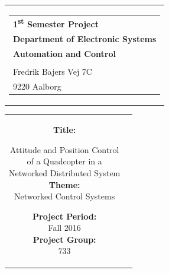 % 
\begin{nopagebreak}
{\samepage 

\begin{tabular}{r}
\parbox{\textwidth}{  
\hfill \hspace{2cm} \parbox{8cm}{\begin{tabular}{l} %
{\small \textbf{\textcolor{aaublue}{\colorbox{white}{1\textsuperscript{st} Semester Project}}}}\\
{\small \textbf{\textcolor{aaublue}{Department of Electronic Systems}}}\\
{\small \textbf{\textcolor{aaublue}{Automation and Control}}}\\ 
{\small \textbf{\textcolor{aaublue}{}}}\\
{\small \textcolor{aaublue}{Fredrik Bajers Vej 7C}} \\
{\small \textcolor{aaublue}{9220 Aalborg}} \\
\end{tabular}}}
\end{tabular}

\begin{tabular}{cc}
\parbox{7cm}{

\textbf{Title:}

Attitude and Position Control\\ of a Quadcopter in a \\Networked Distributed System \\

\textbf{Theme:} \\
\small{Networked Control Systems
\\
}


\parbox{8cm}{


\textbf{Project Period:}\\
Fall 2016\\
   
\textbf{Project Group:}\\
733\\ %
  
}}
\end{tabular}}
\end{nopagebreak}
